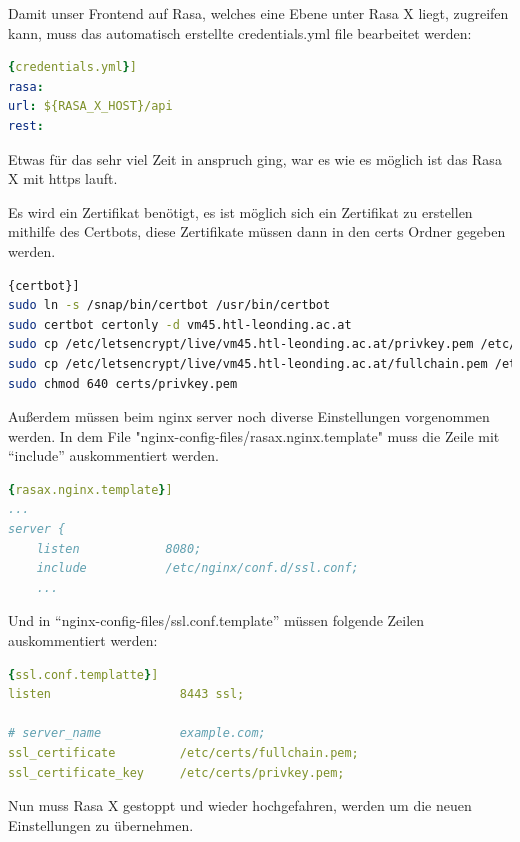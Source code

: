 Damit unser Frontend auf Rasa, welches eine Ebene unter Rasa X liegt, zugreifen kann, muss das automatisch erstellte credentials.yml file bearbeitet werden:

\begin{lstlisting}[language=yaml,label={lst:rasaXCred},caption={credentials.yml}]{credentials.yml}]
rasa:
url: ${RASA_X_HOST}/api
rest:
\end{lstlisting}

Etwas für das sehr viel Zeit in anspruch ging, war es wie es möglich ist das Rasa X mit https lauft.

Es wird ein Zertifikat benötigt, es ist möglich sich ein Zertifikat zu erstellen mithilfe des Certbots\cite{certbot}, diese Zertifikate müssen dann in den certs Ordner gegeben werden.

\begin{lstlisting}[language=bash,label={lst:certbot},caption={Install certbot and create certificates}]{certbot}]
sudo ln -s /snap/bin/certbot /usr/bin/certbot
sudo certbot certonly -d vm45.htl-leonding.ac.at
sudo cp /etc/letsencrypt/live/vm45.htl-leonding.ac.at/privkey.pem /etc/rasa/certs/
sudo cp /etc/letsencrypt/live/vm45.htl-leonding.ac.at/fullchain.pem /etc/rasa/certs/
sudo chmod 640 certs/privkey.pem
\end{lstlisting}

Außerdem müssen beim nginx server noch diverse Einstellungen vorgenommen werden.
In dem File "nginx-config-files/rasax.nginx.template" muss die Zeile mit ``include'' auskommentiert werden.
\begin{lstlisting}[language=yaml,label={lst:rasaxnginxtemplate},caption={rasax.nginx.template}]{rasax.nginx.template}]
...
server {
    listen            8080;
    include           /etc/nginx/conf.d/ssl.conf;
    ...
\end{lstlisting}

Und in ``nginx-config-files/ssl.conf.template'' müssen folgende Zeilen auskommentiert werden:
\begin{lstlisting}[language=yaml,label={lst:sslconftemplate},caption={ssl.conf.template}]{ssl.conf.templatte}]
listen                  8443 ssl;

# server_name           example.com;
ssl_certificate         /etc/certs/fullchain.pem;
ssl_certificate_key     /etc/certs/privkey.pem;
\end{lstlisting}

Nun muss Rasa X gestoppt und wieder hochgefahren, werden um die neuen Einstellungen zu übernehmen.

